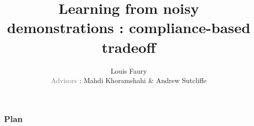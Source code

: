 \documentclass[t]{beamer}
\begin{document}
\title[Learning from noisy demonstrations : a exploration/exploitation tradeoff]{Learning from noisy demonstrations : compliance-based tradeoff}
\author[]{Louis Faury\\ \vspace{5pt} \small{\textcolor{gray}{Advisors} : Mahdi Khoramshahi \& Andrew Sutcliffe}}
\newenvironment{subenv}{\only{\setbeamercolor{local structure}{fg=red}}}{}
\graphicspath{{../report/Images/}}
\titlepage

\begin{frame}[t]
	\vspace{-3ex}
	\frametitle{Plan}
  	\tableofcontents
\end{frame}
\end{document}
